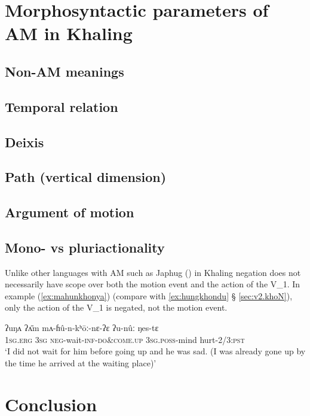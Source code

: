 \documentclass[oneside,a4paper,11pt]{article}
\newcommand{\ipa}[1]{{\phon#1}}
\begin{document}
\section{Morphosyntactic parameters of AM in Khaling}

\subsection{Non-AM meanings} \label{sec:non.am}
\subsection{Temporal relation} \label{sec:temporal}
\subsection{Deixis} \label{sec:deixis}
\subsection{Path (vertical dimension)} \label{sec:vertical}
\subsection{Argument of motion} \label{sec:argument}
\subsection{Mono- vs pluriactionality} \label{sec:pluriactionality}

Unlike other languages with AM such as Japhug (\citealt[202-203]{jacques13harmonization}) in Khaling negation does not necessarily have scope over both the motion event and the action of the V_1. In example (\ref{ex:mahunkhonya}) (compare with \ref{ex:hungkhondu} § \ref{sec:v2.khoN}), only the action of the V_1 is negated, not the motion event.  


\begin{exe}
\ex \label{ex:mahunkhonya}
 \gll
\ipa{ʔuŋʌ} \ipa{ʔʌ̄m} \ipa{mʌ-ɦû-n-kʰōː-nɛ-ʔɛ} \ipa{ʔu-nûː} \ipa{ŋes-tɛ} \\
\textsc{1sg}.\textsc{erg} \textsc{3sg} \textsc{neg}-wait-\textsc{inf}-\textsc{do\&come.up} \textsc{3sg}.\textsc{poss}-mind hurt-2/3:\textsc{pst} \\
\glt `I did not wait for him before going up and he was sad. (I was already gone up by the time he arrived at the waiting place)'
\end{exe}

\section{Conclusion}



\end{document}
